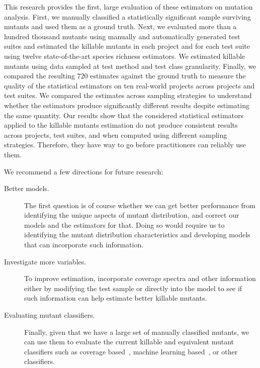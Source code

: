 \documentclass[sigconf,review,anonymous]{acmart}
\newcommand{\estimatorCount}{twelve\xspace}
\newcounter{todocounter}
\newcommand{\todo}[1]{\marginpar{$|$}\textcolor{red}{\stepcounter{todocounter}\footnote[\thetodocounter]{\textcolor{red}{\textbf{TODO }}\textit{#1}}}}
\renewcommand{\todo}[1]{}
\begin{document}
This research provides the first, large evaluation of these estimators on mutation analysis. 
%
First, we manually classified a statistically significant sample surviving mutants 
and used them as a ground truth.
%
Next, we evaluated more than a hundred thousand mutants
using manually and automatically generated test suites and
estimated the killable mutants in each project and for each test suite
using \estimatorCount state-of-the-art species richness estimators.
We estimated killable mutants using data sampled at test method
and test class granularity.
%
Finally, we compared the resulting $720$ estimates against the ground truth
 to measure the quality of the statistical estimators on ten real-world projects
 across projects and test suites.
 We compared the estimates across sampling strategies to understand
 whether the estimators produce %
 significantly different results despite estimating the same quantity. %
%
Our results show that the considered statistical estimators %
applied to the killable mutants estimation do not produce consistent results across
projects, test suites, and when computed using different sampling strategies.
Therefore, they have way to go before practitioners can reliably use them.


We recommend a few directions for future research:

\begin{description}
\item[Better models.] The first question is of course whether we can get better
performance from identifying the unique aspects of mutant distribution, and
correct our models and the estimators for that. 
%
Doing so would require us to identifying the mutant distribution characteristics
and developing models that can incorporate such information. 

\item[Investigate more variables.] To improve estimation, incorporate
 coverage spectra and other information either by modifying the test sample
or directly into the model to see if such information can help estimate better
killable mutants.

\item[Evaluating mutant classifiers.] Finally, given that we have a large set
of manually classified mutants, we can use them to evaluate the current
killable and equivalent mutant classifiers such as coverage
based~\cite{schuler2013covering}, machine learning
based~\cite{peacock2021automatic,naem2020a}, or
other~\cite{papadakis2013mutation} classifiers.

\end{description}
\end{document}

